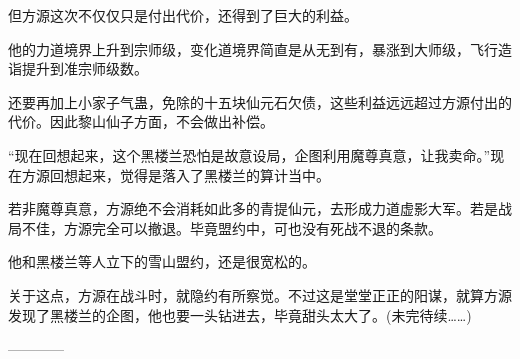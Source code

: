 \begin{this_body}
但方源这次不仅仅只是付出代价，还得到了巨大的利益。

他的力道境界上升到宗师级，变化道境界简直是从无到有，暴涨到大师级，飞行造诣提升到准宗师级数。

还要再加上小家子气蛊，免除的十五块仙元石欠债，这些利益远远超过方源付出的代价。因此黎山仙子方面，不会做出补偿。

“现在回想起来，这个黑楼兰恐怕是故意设局，企图利用魔尊真意，让我卖命。”现在方源回想起来，觉得是落入了黑楼兰的算计当中。

若非魔尊真意，方源绝不会消耗如此多的青提仙元，去形成力道虚影大军。若是战局不佳，方源完全可以撤退。毕竟盟约中，可也没有死战不退的条款。

他和黑楼兰等人立下的雪山盟约，还是很宽松的。

关于这点，方源在战斗时，就隐约有所察觉。不过这是堂堂正正的阳谋，就算方源发现了黑楼兰的企图，他也要一头钻进去，毕竟甜头太大了。(未完待续……)

------------

\end{this_body}

